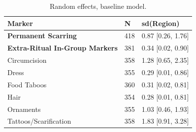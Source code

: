 \begin{table}[!ht]
\centering
\small
\caption{Random effects, baseline model.}
\label{tab:intonly_random_effects_baseline}
\begin{tabular}{lll}
\toprule
Marker & N & sd(Region) \\
\midrule
\textbf{Permanent Scarring} & 418 & 0.87 [0.26, 1.76] \\
\textbf{Extra-Ritual In-Group Markers} & 381 & 0.34 [0.02, 0.90] \\
\midrule
Circumcision & 358 & 1.28 [0.65, 2.35] \\
Dress & 355 & 0.29 [0.01, 0.86] \\
Food Taboos & 360 & 0.31 [0.02, 0.81] \\
Hair & 354 & 0.28 [0.01, 0.81] \\
Ornaments & 355 & 1.03 [0.46, 1.93] \\
Tattoos/Scarification & 358 & 1.83 [0.91, 3.28] \\
\bottomrule
\end{tabular}
\end{table}